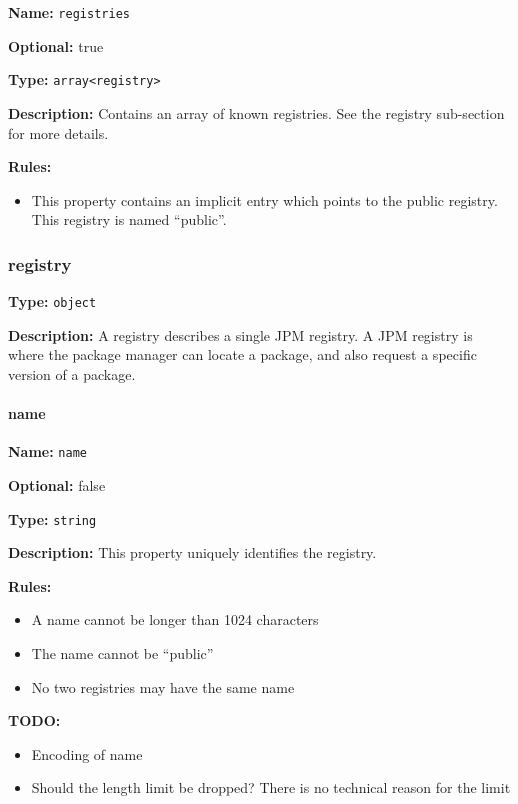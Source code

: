 \textbf{Name:} \texttt{registries}

\textbf{Optional:} true

\textbf{Type:} \texttt{array\textless{}registry\textgreater{}}

\textbf{Description:} Contains an array of known registries. See the
registry sub-section for more details.

\textbf{Rules:}

\begin{itemize}
\tightlist
\item
  This property contains an implicit entry which points to the public
  registry. This registry is named ``public''.
\end{itemize}

\hypertarget{registry-1}{\subsubsection{registry}\label{registry-1}}

\textbf{Type:} \texttt{object}

\textbf{Description:} A registry describes a single JPM registry. A JPM
registry is where the package manager can locate a package, and also
request a specific version of a package.

\hypertarget{name-2}{\paragraph{name}\label{name-2}}

\textbf{Name:} \texttt{name}

\textbf{Optional:} false

\textbf{Type:} \texttt{string}

\textbf{Description:} This property uniquely identifies the registry.

\textbf{Rules:}

\begin{itemize}
\tightlist
\item
  A name cannot be longer than 1024 characters
\item
  The name cannot be ``public''
\item
  No two registries may have the same name
\end{itemize}

\textbf{TODO:}

\begin{itemize}
\tightlist
\item
  Encoding of name
\item
  Should the length limit be dropped? There is no technical reason for
  the limit
\end{itemize}

